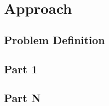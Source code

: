\chapter{Approach}\label{chap:approach}

\section{Problem Definition}

\section{Part 1}

\section{Part N}